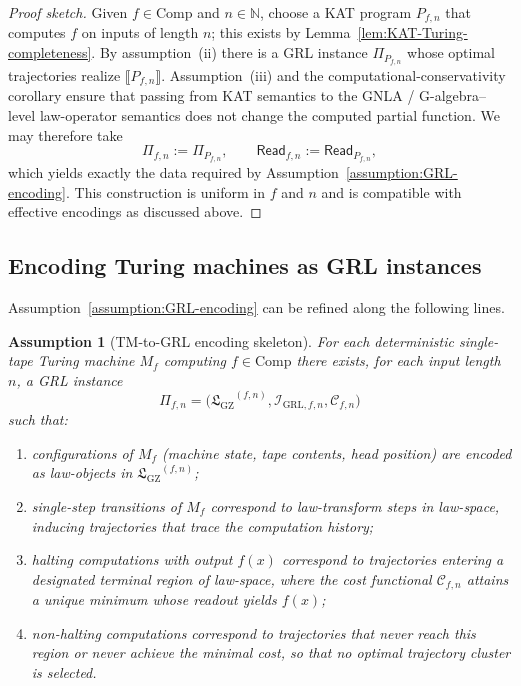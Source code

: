 \documentclass[11pt]{book}
\newcommand{\GZLS}{\ensuremath{\mathfrak{L}_{\mathrm{GZ}}}}
\theoremstyle{plain}
\newtheorem{assumption}[theorem]{Assumption}
\theoremstyle{definition}
\theoremstyle{remark}
\begin{document}
\begin{proof}[Proof sketch]
Given $f\in\mathrm{Comp}$ and $n\in\mathbb{N}$, choose a KAT program
$P_{f,n}$ that computes $f$ on inputs of length $n$; this exists by
Lemma~\ref{lem:KAT-Turing-completeness}. By assumption~(ii) there is a
GRL instance $\Pi_{P_{f,n}}$ whose optimal trajectories realize
$\llbracket P_{f,n}\rrbracket$. Assumption~(iii) and the
computational-conservativity corollary ensure that passing from KAT
semantics to the GNLA / G-algebra--level law-operator semantics does not
change the computed partial function. We may therefore take
\[
  \Pi_{f,n} := \Pi_{P_{f,n}},
  \qquad
  \mathsf{Read}_{f,n} := \mathsf{Read}_{P_{f,n}},
\]
which yields exactly the data required by
Assumption~\ref{assumption:GRL-encoding}. This construction is uniform
in $f$ and $n$ and is compatible with effective encodings as discussed
above.
\end{proof}

\subsection{Encoding Turing machines as GRL instances}

Assumption~\ref{assumption:GRL-encoding} can be refined along the
following lines.

\begin{assumption}[TM-to-GRL encoding skeleton]
For each deterministic single-tape Turing machine $M_f$ computing
$f\in\mathrm{Comp}$ there exists, for each input length $n$, a GRL
instance
\[
  \Pi_{f,n}
  =
  \bigl(
    \GZLS^{(f,n)},
    \mathcal{I}_{\mathrm{GRL},f,n},
    \mathcal{C}_{f,n}
  \bigr)
\]
such that:
\begin{enumerate}[label=(\roman*)]
  \item configurations of $M_f$ (machine state, tape contents, head
        position) are encoded as law-objects in $\GZLS^{(f,n)}$;
  \item single-step transitions of $M_f$ correspond to law-transform
        steps in law-space, inducing trajectories that trace the
        computation history;
  \item halting computations with output $f(x)$ correspond to
        trajectories entering a designated terminal region of
        law-space, where the cost functional $\mathcal{C}_{f,n}$
        attains a unique minimum whose readout yields $f(x)$;
  \item non-halting computations correspond to trajectories that
        never reach this region or never achieve the minimal cost, so
        that no optimal trajectory cluster is selected.
\end{enumerate}
\end{assumption}
\end{document}
